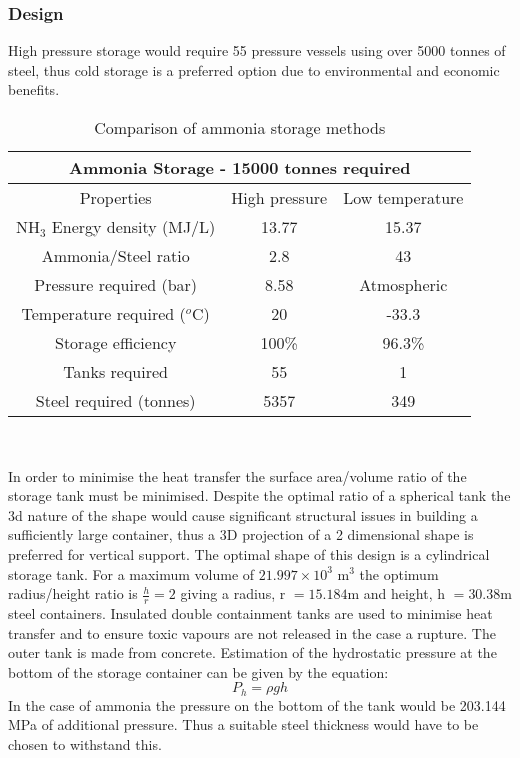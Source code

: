 \subsubsection{Design}
High pressure storage would require 55 pressure vessels using over 5000 tonnes of steel, thus cold storage is a preferred option due to environmental and economic benefits. 

\begin{table}[!htbp]
	\begin{center}
		\caption{Comparison of ammonia storage methods}
		\begin{tabular}{ |c||c||c|| }
			\hline
			\multicolumn{3}{|c|}{Ammonia Storage - 15000 tonnes required } \\
			\hline
			
			Properties & High pressure& Low temperature\\
			\hline
			NH$_3$ Energy density (MJ/L) & 13.77& 15.37\\
			Ammonia/Steel ratio & 2.8& 43\\
			Pressure required (bar) & 8.58 &Atmospheric\\
			Temperature required ($^o$C)& 20 &-33.3\\
			Storage efficiency&100\%&96.3\% \\
			
			Tanks required   &55&1 \\
			Steel required (tonnes)   &5357&349 \\
			
			
			\hline
		\end{tabular}
		\\
	
		
	\end{center}
	
\end{table}


In order to minimise the heat transfer the surface area/volume ratio of the storage tank must be minimised. Despite the optimal ratio of a spherical tank the 3d nature of the shape would cause significant structural issues in building a sufficiently large container, thus a 3D projection of a 2 dimensional shape is preferred for vertical support. The optimal shape of this design is a cylindrical storage tank. For a maximum volume of $21.997\times10^3$ m$^3$ the optimum radius/height ratio is $\frac{h}{r} = 2$ giving a radius, r $ = 15.184$m and height, h $ = 30.38$m steel containers. Insulated double containment tanks are used to minimise heat transfer and to ensure toxic vapours are not released in the case a rupture. The outer tank is made from concrete. Estimation of the hydrostatic pressure at the bottom of the storage container can be given by the equation:
\begin{equation}
P_h= \rho g h
\end{equation}
In the case of ammonia the pressure on the bottom of the tank would be 203.144 MPa of additional pressure. Thus a suitable steel thickness would have to be chosen to withstand this.

